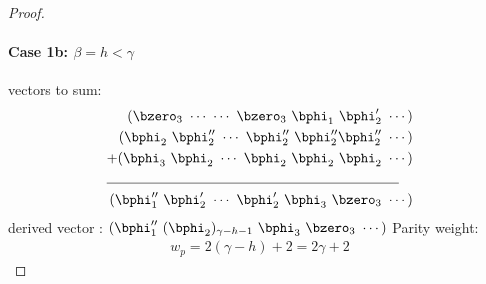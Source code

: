 \begin{proof}
\paragraph{Case 1b: $\beta=h<\gamma$\newline}
 vectors to sum:
\begin{align*}
(\bzero_{3}~\cdots~\cdots~\bzero_{3}~\bphi_1~\bphi'_2~\cdots)\\
(\bphi_2~\bphi''_2~\cdots~\bphi''_2~\bphi''_2\bphi''_2~\cdots)\\
+(\bphi_3~\bphi_2~\cdots~\bphi_2~\bphi_2~\bphi_2~\cdots)\\
\cline{1-2}
(\bphi''_1~\bphi'_2~\cdots~\bphi'_2~\bphi_3~\bzero_3~\cdots)
\end{align*}
derived vector : $(\bphi''_1~(\bphi_2)_{\gamma-h-1}~\bphi_3~\bzero_3~\cdots)$\newline
Parity weight: \begin{equation}
\begin{split}
w_p=2(\gamma-h)+2=2\gamma+2
\end{split}
\end{equation}


\end{proof}

